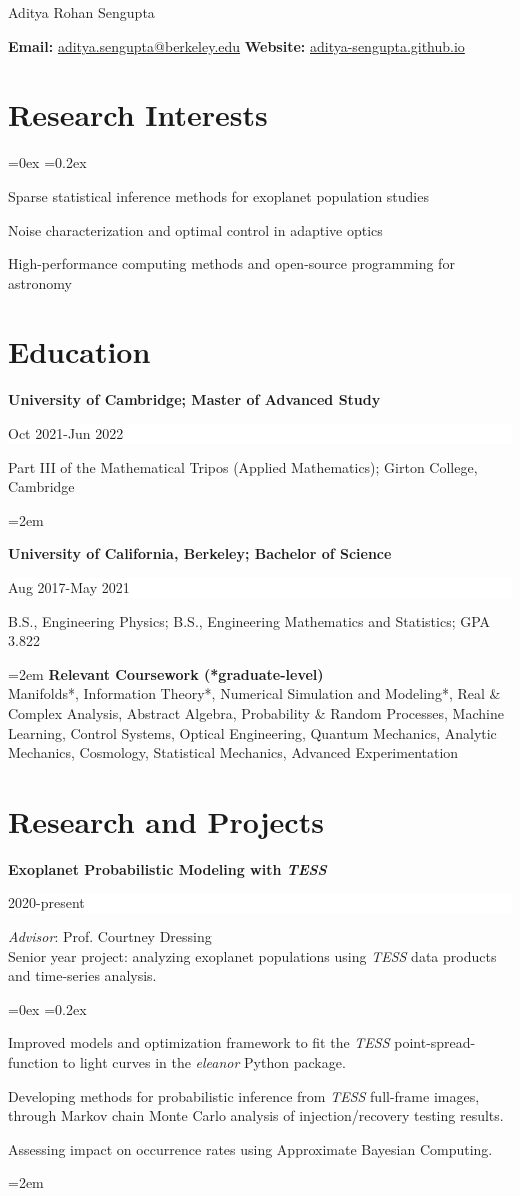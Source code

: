 \documentclass[paper=a4,fontsize=12pt]{scrartcl}
\newcommand{\cvlist}{%

    \rightmargin=0in
    \leftmargin=0.15in
    \topsep=0ex
    \partopsep=0pt
    \itemsep=0.2ex 
    \parsep=0pt
    \itemindent=0.0\leftmargin
    \listparindent=3.0\leftmargin
    \settowidth{\labelsep}{~}
    \leftskip=-10.1in
    \parindent=-0.1in
}
\newcommand{\MyName}[1]{ %
                {\centering \Huge #1
                \par \normalsize \normalfont}}
\newcommand{\NewPart}[1]{\section*{{#1}}}
\newcommand{\EducationEntry}[4]{
		\noindent \textbf{#1} \hfill      %
		\colorbox{White}{%
			\parbox{5cm}{%
			\hfill\color{Black}#2}} \par  %
		\noindent #3 \par        %
		\noindent\hangindent=2em\hangafter=0 \small #4 %
		\normalsize \par}
\begin{document}
\MyName{Aditya Rohan Sengupta}

\vspace{0.4cm}
\noindent\textbf{Email:} \url{aditya.sengupta@berkeley.edu} \hfill \textbf{Website:} \url{aditya-sengupta.github.io} 
\vspace{-0.5cm}

\NewPart{Research Interests}
\begin{list}{}{\cvlist}
\item Sparse statistical inference methods for exoplanet population studies
\item Noise characterization and optimal control in adaptive optics
\item High-performance computing methods and open-source programming for astronomy
\end{list}

\NewPart{Education}

\EducationEntry{\noindent University of Cambridge; Master of Advanced Study}{Oct 2021-Jun 2022}{Part III of the Mathematical Tripos (Applied Mathematics); Girton College, Cambridge}{}

\EducationEntry{\noindent University of California, Berkeley; Bachelor of Science}{Aug 2017-May 2021}{B.S., Engineering Physics; B.S., Engineering Mathematics and Statistics; GPA 3.822}{\textbf{Relevant Coursework (*graduate-level)}\\ Manifolds*, Information Theory*, Numerical Simulation and Modeling*, Real \& Complex Analysis, Abstract Algebra, Probability \& Random Processes, Machine Learning, Control Systems, Optical Engineering, Quantum Mechanics, Analytic Mechanics, Cosmology, Statistical Mechanics, Advanced Experimentation}
\noindent

\vspace{-0.5cm}
\NewPart{Research and Projects}

\EducationEntry{Exoplanet Probabilistic Modeling with \textit{TESS}}{2020-present}{
\textit{Advisor}: Prof. Courtney Dressing\\
Senior year project: analyzing exoplanet populations using \textit{TESS} data products and time-series analysis.

\begin{list}{\textbullet}{\cvlist}
    \item Improved models and optimization framework to fit the \textit{TESS} point-spread-function to light curves in the \textit{eleanor} Python package.
    \item Developing methods for probabilistic inference from \textit{TESS} full-frame images, through Markov chain Monte Carlo analysis of injection/recovery testing results.
    \item Assessing impact on occurrence rates using Approximate Bayesian Computing.
\end{list}
}
\hfill
\end{document}

